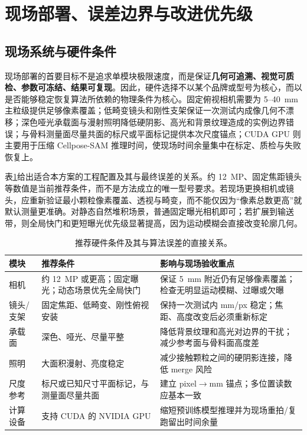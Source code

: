 \section{现场部署、误差边界与改进优先级}
\label{sec:r-deploy}

\subsection{现场系统与硬件条件}

现场部署的首要目标不是追求单模块极限速度，而是保证\textbf{几何可追溯、视觉可质检、参数可冻结、结果可复现}。因此，硬件选择不以某个品牌或型号为核心，而以是否能够稳定恢复算法所依赖的物理条件为核心。固定俯视相机需要为 5--40~mm 主粒级提供足够像素覆盖；低畸变镜头和刚性支架保证一次测试内成像几何不漂移；深色哑光承载面与漫射照明降低硬阴影、高光和背景纹理造成的实例边界错误；与骨料测量面尽量共面的标尺或平面标记提供本次尺度锚点；CUDA GPU 则主要用于压缩 Cellpose-SAM 推理时间，使现场时间余量集中在标定、质检与失败恢复上。

表\ref{tab:r-hardware}给出适合本方案的工程配置及其与最终误差的关系。约 12~MP、固定焦距镜头等数值是当前推荐条件，而不是方法成立的唯一型号要求。若现场更换相机或镜头，应重新验证最小颗粒像素覆盖、透视与畸变，而不能仅因为“像素总数更高”就默认测量更准确。对静态自然堆积场景，普通固定曝光相机即可；若扩展到输送带，则全局快门和更短曝光优先级显著提高，因为运动模糊会直接改变轮廓几何。

\begin{table}[t]
\centering
\caption{推荐硬件条件及其与算法误差的直接关系。}
\label{tab:r-hardware}
\footnotesize
\renewcommand{\arraystretch}{1.12}
\begin{tabular}{>{\raggedright\arraybackslash}p{2.0cm}>{\raggedright\arraybackslash}p{4.0cm}>{\raggedright\arraybackslash}p{6.6cm}}
\toprule
模块 & 推荐条件 & 影响与现场验收重点 \\
\midrule
相机 & 约 12~MP 或更高；固定曝光；动态场景优先全局快门 & 保证 5~mm 附近仍有足够像素覆盖；检查无明显运动模糊、过曝或欠曝 \\
镜头/支架 & 固定焦距、低畸变、刚性俯视安装 & 保持一次测试内 mm/px 稳定；焦距、高度改变后必须重新标定 \\
承载面 & 深色、哑光、尽量平整 & 降低背景纹理和高光对边界的干扰；减少参考面与骨料面高度差 \\
照明 & 大面积漫射、亮度稳定 & 减少接触颗粒之间的硬阴影连接，降低 merge 风险 \\
尺度参考 & 标尺或已知尺寸平面标记，与测量面尽量共面 & 建立 pixel$\rightarrow$mm 锚点；多位置读数应基本一致 \\
计算设备 & 支持 CUDA 的 NVIDIA GPU & 缩短预训练模型推理并为现场重拍/复跑留出时间余量 \\
\bottomrule
\end{tabular}
\end{table}

